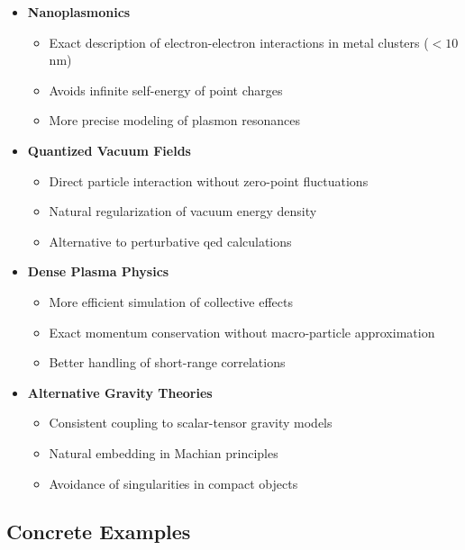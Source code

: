 \begin{itemize}
    \item \textbf{Nanoplasmonics}
    \begin{itemize}
        \item Exact description of electron-electron interactions in metal clusters ($<10$\,nm)
        \item Avoids infinite self-energy of point charges
        \item More precise modeling of plasmon resonances
    \end{itemize}
    
    \item \textbf{Quantized Vacuum Fields}
    \begin{itemize}
        \item Direct particle interaction without zero-point fluctuations
        \item Natural regularization of vacuum energy density
        \item Alternative to perturbative \gls{qed} calculations
    \end{itemize}
    
    \item \textbf{Dense Plasma Physics}
    \begin{itemize}
        \item More efficient simulation of collective effects
        \item Exact momentum conservation without macro-particle approximation
        \item Better handling of short-range correlations
    \end{itemize}
    
    \item \textbf{Alternative Gravity Theories}
    \begin{itemize}
        \item Consistent coupling to scalar-tensor gravity models
        \item Natural embedding in Machian principles \cite{Assis1999}
        \item Avoidance of singularities in compact objects
    \end{itemize}
\end{itemize}

\subsection{Concrete Examples}

